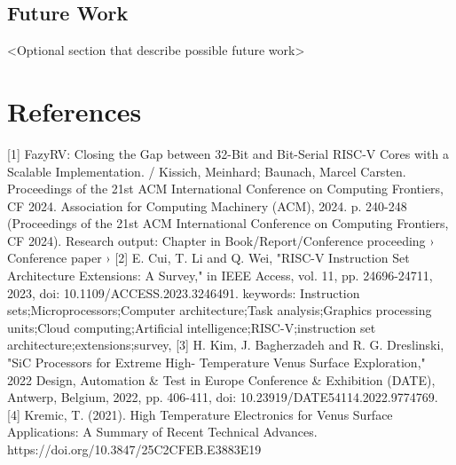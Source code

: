 \documentclass[10pt,twocolumn]{article}
\begin{document}
\subsection{Future Work}
<Optional section that describe possible future work>

\section*{References}
[1] FazyRV: Closing the Gap between 32-Bit and Bit-Serial RISC-V Cores with a Scalable Implementation. / Kissich, Meinhard; Baunach, Marcel Carsten.
Proceedings of the 21st ACM International Conference on Computing Frontiers, CF 2024. Association for Computing Machinery (ACM), 2024. p. 240-248 (Proceedings of the 21st ACM International Conference on Computing Frontiers, CF 2024).
Research output: Chapter in Book/Report/Conference proceeding › Conference paper ›
[2] E. Cui, T. Li and Q. Wei, "RISC-V Instruction Set Architecture Extensions: A Survey," in IEEE Access, vol. 11, pp. 24696-24711, 2023, doi: 10.1109/ACCESS.2023.3246491.
keywords: {Instruction sets;Microprocessors;Computer architecture;Task analysis;Graphics processing units;Cloud computing;Artificial intelligence;RISC-V;instruction set architecture;extensions;survey},
[3] H. Kim, J. Bagherzadeh and R. G. Dreslinski, "SiC Processors for Extreme High- Temperature Venus Surface Exploration," 2022 Design, Automation & Test in Europe Conference & Exhibition (DATE), Antwerp, Belgium, 2022, pp. 406-411, doi: 10.23919/DATE54114.2022.9774769.
[4] Kremic, T. (2021). High Temperature Electronics for Venus Surface Applications: A Summary of Recent Technical Advances. https://doi.org/10.3847/25C2CFEB.E3883E19
\end{document}
